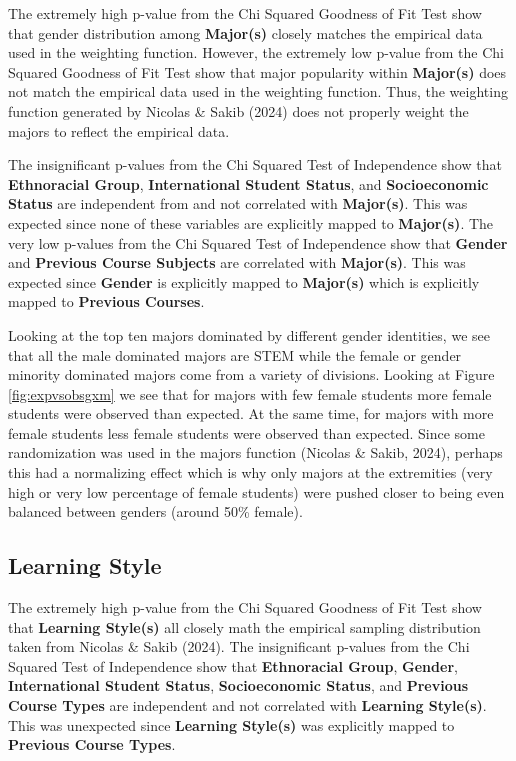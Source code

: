 \documentclass{article}
\begin{document}
\label{sec:major_dis}

The extremely high p-value from the Chi Squared Goodness of Fit Test show that gender distribution among \textbf{Major(s)} closely matches the empirical data used in the weighting function. However, the extremely low p-value from the Chi Squared Goodness of Fit Test show that major popularity within \textbf{Major(s)} does not match the empirical data used in the weighting function. Thus, the weighting function generated by Nicolas \& Sakib (2024) does not properly weight the majors to reflect the empirical data.

The insignificant p-values from the Chi Squared Test of Independence show that \textbf{Ethnoracial Group}, \textbf{International Student Status}, and \textbf{Socioeconomic Status} are independent from and not correlated with \textbf{Major(s)}. This was expected since none of these variables are explicitly mapped to \textbf{Major(s)}. The very low p-values from the Chi Squared Test of Independence show that \textbf{Gender} and \textbf{Previous Course Subjects} are correlated with \textbf{Major(s)}. This was expected since \textbf{Gender} is explicitly mapped to \textbf{Major(s)} which is explicitly mapped to \textbf{Previous Courses}.

Looking at the top ten majors dominated by different gender identities, we see that all the male dominated majors are STEM while the female or gender minority dominated majors come from a variety of divisions. Looking at Figure \ref{fig:expvsobsgxm} we see that for majors with few female students more female students were observed than expected. At the same time, for majors with more female students less female students were observed than expected. Since some randomization was used in the majors function (Nicolas \& Sakib, 2024), perhaps this had a normalizing effect which is why only majors at the extremities (very high or very low percentage of female students) were pushed closer to being even balanced between genders (around 50\% female).

\subsection{Learning Style}\label{learning-style-2}

\label{sec:learning_style_dis}

The extremely high p-value from the Chi Squared Goodness of Fit Test show that \textbf{Learning Style(s)} all closely math the empirical sampling distribution taken from Nicolas \& Sakib (2024). The insignificant p-values from the Chi Squared Test of Independence show that \textbf{Ethnoracial Group}, \textbf{Gender}, \textbf{International Student Status}, \textbf{Socioeconomic Status}, and \textbf{Previous Course Types} are independent and not correlated with \textbf{Learning Style(s)}. This was unexpected since \textbf{Learning Style(s)} was explicitly mapped to \textbf{Previous Course Types}.
\end{document}
